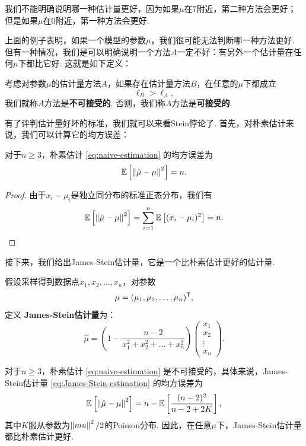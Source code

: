 我们不能明确说明哪一种估计量更好，因为如果$\mu$在$7$附近，第二种方法会更好；但是如果$\mu$在$0$附近，第一种方法会更好. 

上面的例子表明，如果一个模型的参数$\mu$，我们很可能无法判断哪一种方法更好. 但有一种情况，我们是可以明确说明一个方法$A$一定不好：有另外一个估计量在任何$\mu$下都比它好. 这就是如下定义：

\begin{definition}[可接受性]
考虑对参数$\mu$的估计量方法$A$，如果存在估计量方法$B$，在任意的$\mu$下都成立
\[\ell_B > \ell_A,\]
我们就称$A$方法是\textbf{不可接受的}. 否则，我们称$A$方法是\textbf{可接受的}. 
\end{definition}

有了评判估计量好坏的标准，我们就可以来看Stein悖论了. 首先，对朴素估计来说，我们可以计算它的均方误差：

\begin{lemma}\label{lemma:naive-estimation}
    对于$n\geq 3$，朴素估计 \eqref{eq:naive-estimation} 的均方误差为
    \[\mathbb{E}\left[\left\|\hat{\mu}-\mu\right\|^2\right] = n.\]
\end{lemma}
\begin{proof}
    由于$x_i-\mu_i$是独立同分布的标准正态分布，我们有
    \[\mathbb{E}\left[\left\|\hat{\mu}-\mu\right\|^2\right] = \sum_{i=1}^n\mathbb{E}\left[(x_i-\mu_i)^2\right] = n.\]
\end{proof}

接下来，我们给出James-Stein估计量，它是一个比朴素估计更好的估计量.

\begin{definition}
假设采样得到数据点$x_1,x_2,\dots,x_n$，对参数
\[\mu=(\mu_1,\mu_2,\dots,\mu_n)^{\mathsf{T}},\]
定义 \textbf{James-Stein估计量}为：
\begin{equation}
    \hat{\mu} = \left(1 - \frac{n-2}{x_1^2+x_2^2+\dots+x_n^2}\right)\begin{pmatrix}
        x_1 \\ x_2 \\ \vdots \\ x_n
        \end{pmatrix}.\label{eq:James-Stein-estimation}        
\end{equation}
\end{definition}

\begin{theorem}[Stein悖论]\label{thm:stein-paradox}
    对于$n\geq 3$，朴素估计 \eqref{eq:naive-estimation} 是不可接受的，具体来说，James-Stein估计量 \eqref{eq:James-Stein-estimation} 的均方误差为
    \[\mathbb{E}\left[\left\|\hat{\mu}-\mu\right\|^2\right] = n-\mathbb{E}\left[\frac{(n-2)^2}{n-2+2K}\right],\]
    其中$K$服从参数为$\left\|mu\right\|^2/2$的Poisson分布. 因此，在任意$\mu$下，James-Stein估计量都比朴素估计更好. 
\end{theorem}

